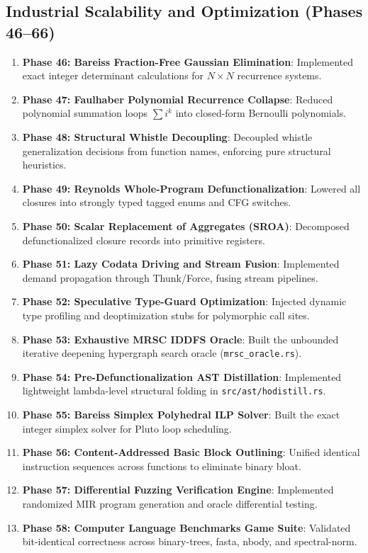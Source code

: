 \subsection{Industrial Scalability and Optimization (Phases 46--66)}
\begin{enumerate}
    \item \textbf{Phase 46: Bareiss Fraction-Free Gaussian Elimination}: Implemented exact integer determinant calculations for $N \times N$ recurrence systems.
    \item \textbf{Phase 47: Faulhaber Polynomial Recurrence Collapse}: Reduced polynomial summation loops $\sum i^k$ into closed-form Bernoulli polynomials.
    \item \textbf{Phase 48: Structural Whistle Decoupling}: Decoupled whistle generalization decisions from function names, enforcing pure structural heuristics.
    \item \textbf{Phase 49: Reynolds Whole-Program Defunctionalization}: Lowered all closures into strongly typed tagged enums and CFG switches.
    \item \textbf{Phase 50: Scalar Replacement of Aggregates (SROA)}: Decomposed defunctionalized closure records into primitive registers.
    \item \textbf{Phase 51: Lazy Codata Driving and Stream Fusion}: Implemented demand propagation through Thunk/Force, fusing stream pipelines.
    \item \textbf{Phase 52: Speculative Type-Guard Optimization}: Injected dynamic type profiling and deoptimization stubs for polymorphic call sites.
    \item \textbf{Phase 53: Exhaustive MRSC IDDFS Oracle}: Built the unbounded iterative deepening hypergraph search oracle (\texttt{mrsc\_oracle.rs}).
    \item \textbf{Phase 54: Pre-Defunctionalization AST Distillation}: Implemented lightweight lambda-level structural folding in \texttt{src/ast/hodistill.rs}.
    \item \textbf{Phase 55: Bareiss Simplex Polyhedral ILP Solver}: Built the exact integer simplex solver for Pluto loop scheduling.
    \item \textbf{Phase 56: Content-Addressed Basic Block Outlining}: Unified identical instruction sequences across functions to eliminate binary bloat.
    \item \textbf{Phase 57: Differential Fuzzing Verification Engine}: Implemented randomized MIR program generation and oracle differential testing.
    \item \textbf{Phase 58: Computer Language Benchmarks Game Suite}: Validated bit-identical correctness across binary-trees, fasta, nbody, and spectral-norm.

\end{enumerate}
